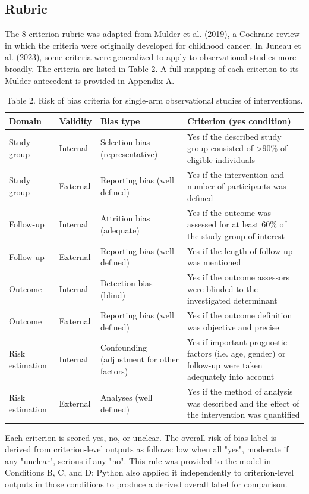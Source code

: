 \documentclass[11pt,a4paper]{article}
\begin{document}
\subsection{Rubric}

The 8-criterion rubric was adapted from Mulder et al. (2019), a Cochrane review in which the criteria were originally developed for childhood cancer. In Juneau et al. (2023), some criteria were generalized to apply to observational studies more broadly. The criteria are listed in Table 2. A full mapping of each criterion to its Mulder antecedent is provided in Appendix A.

\begin{table}[H]
\centering
\caption{Table 2. Risk of bias criteria for single-arm observational studies of interventions.}
\label{tab:table2}
\begin{tabular}{llll}
\toprule
Domain & Validity & Bias type & Criterion (yes condition) \\
\midrule
Study group & Internal & Selection bias (representative) & Yes if the described study group consisted of >90\% of eligible individuals \\
Study group & External & Reporting bias (well defined) & Yes if the intervention and number of participants was defined \\
Follow-up & Internal & Attrition bias (adequate) & Yes if the outcome was assessed for at least 60\% of the study group of interest \\
Follow-up & External & Reporting bias (well defined) & Yes if the length of follow-up was mentioned \\
Outcome & Internal & Detection bias (blind) & Yes if the outcome assessors were blinded to the investigated determinant \\
Outcome & External & Reporting bias (well defined) & Yes if the outcome definition was objective and precise \\
Risk estimation & Internal & Confounding (adjustment for other factors) & Yes if important prognostic factors (i.e. age, gender) or follow-up were taken adequately into account \\
Risk estimation & External & Analyses (well defined) & Yes if the method of analysis was described and the effect of the intervention was quantified \\
\bottomrule
\end{tabular}
\end{table}

Each criterion is scored yes, no, or unclear. The overall risk-of-bias label is derived from criterion-level outputs as follows: low when all "yes", moderate if any "unclear", serious if any "no". This rule was provided to the model in Conditions B, C, and D; Python also applied it independently to criterion-level outputs in those conditions to produce a derived overall label for comparison.
\end{document}
